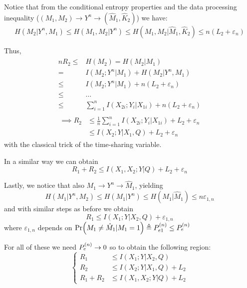 Notice that from the conditional entropy properties and the data processing inequality ($(M_1,M_2)\rightarrow Y^n \rightarrow (\hat{M}_1,\hat{K}_2)$) we have:
%
\begin{equation}
H(M_2|Y^n,M_1) \leq H(M_1,M_2|Y^n) \leq H(M_1,M_2|\hat{M}_1,\hat{K}_2) \leq n(L_2 + \varepsilon_n)
\end{equation}

Thus,
%
\begin{align}
\begin{split}
nR_2 \leq& H(M_2) = H(M_2|M_1)\\
=& I(M_2;Y^n|M_1) + H(M_2|Y^n,M_1)\\
\leq& I(M_2;Y^n|M_1) + n(L_2 + \varepsilon_n)\\
\leq& \ldots\\
\leq& \sum_{i=1}^n I(X_{2i};Y_i|X_{1i}) + n(L_2 + \varepsilon_n)
\end{split}
\end{align}
\begin{eqnarray}
\begin{split}
\implies R_2 &\leq \frac{1}{n} \sum_{i=1}^n I(X_{2i};Y_i|X_{1i}) + L_2 + \varepsilon_n\\
&\leq I(X_2;Y|X_1,Q) + L_2 + \varepsilon_n
\end{split}
\end{eqnarray}
%
with the classical trick of the time-sharing variable.

In a similar way we can obtain
%
\begin{equation}
R_1 + R_2 \leq I(X_1,X_2;Y|Q) + L_2 + \varepsilon_n
\end{equation}

Lastly, we notice that also $M_1 \rightarrow Y^n \rightarrow \hat{M}_1$, yielding
%
\begin{equation}
H(M_1|Y^n,M_2) \leq H(M_1|Y^n) \leq H(M_1|\hat{M}_1) \leq n\varepsilon_{1,n}
\end{equation}
%
and with similar steps as before we obtain
%
\begin{equation}
R_1 \leq I(X_1;Y|X_2,Q) + \varepsilon_{1,n}
\end{equation}
%
where $\varepsilon_{1,n}$ depends on $\Pr(M_1 \neq \hat{M}_1|M_1=1) \triangleq P_{e1}^{(n)} \leq  P_e^{(n)} $

For all of these we need $ P_e^{(n)}  \rightarrow 0$ so to obtain the following region:
%
\begin{equation}
\begin{cases}
R_1 &\leq I(X_1;Y|X_2,Q)\\
R_2 &\leq I(X_2;Y|X_1,Q) + L_2\\
R_1+R_2 &\leq I(X_1,X_2;Y|Q) + L_2
\end{cases}
\end{equation}